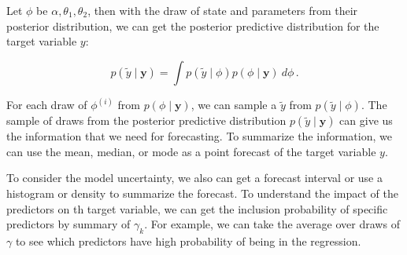 Let $\phi$ be $\alpha, \theta_1, \theta_2$, then with the draw of state and parameters from their posterior distribution, we can get the posterior predictive distribution for the target variable $y$:  



$$p(\tilde y \mid \mathbf{y}) = \int p(\tilde y \mid \phi)p(\phi \mid \mathbf{y})~d \phi \, .$$



For each draw of $\phi^{(i)}$ from $p(\phi \mid \mathbf{y})$, we can sample a $\tilde y$ from $p(\tilde y \mid \phi)$. The sample of draws from the posterior predictive distribution $p(\tilde y \mid \mathbf{y})$ can give us the information that we need for forecasting. To summarize the information, we can use the mean, median, or mode as a point forecast of the target variable $y$.

To consider the model uncertainty, we also can get a forecast interval or  use a histogram or density to summarize the forecast. To understand the impact of the predictors on th target variable, we can get the inclusion probability of specific predictors by summary of $\gamma_k$. For example, we can take the average over draws of $\gamma$ to see which predictors have high probability of being in the regression. 



%